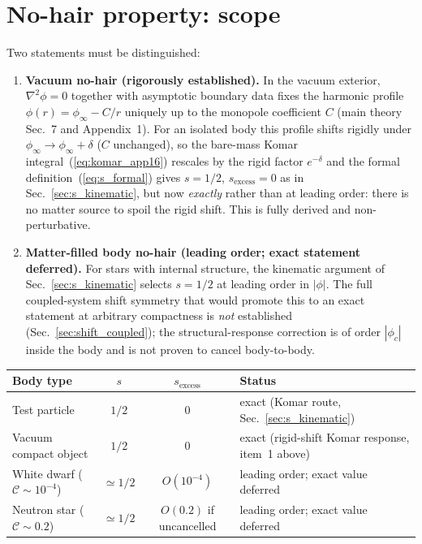 \documentclass[11pt]{article}
\newcommand{\Cc}{\mathcal{C}}
\begin{document}
\section{No-hair property: scope}
\label{sec:nohair}

Two statements must be distinguished:
\begin{enumerate}
\item \textbf{Vacuum no-hair (rigorously established).}
  In the vacuum exterior, $\nabla^2\phi = 0$ together with
  asymptotic boundary data fixes the harmonic profile
  $\phi(r) = \phi_\infty - C/r$ uniquely up to the monopole
  coefficient $C$ (main theory Sec.~7 and Appendix~1).
  For an isolated body this profile shifts rigidly under
  $\phi_\infty\to\phi_\infty+\delta$ ($C$ unchanged), so
  the bare-mass Komar
  integral~(\ref{eq:komar_app16}) rescales by the rigid
  factor $e^{-\delta}$ and the formal
  definition~(\ref{eq:s_formal}) gives $s=1/2$,
  $s_{\mathrm{excess}}=0$ as in
  Sec.~\ref{sec:s_kinematic}, but now \emph{exactly}
  rather than at leading order: there is no matter source
  to spoil the rigid shift.  This is fully derived and
  non-perturbative.
\item \textbf{Matter-filled body no-hair (leading order;
  exact statement deferred).}  For stars with internal
  structure, the kinematic argument of
  Sec.~\ref{sec:s_kinematic} selects $s=1/2$ at leading
  order in $|\phi|$.  The full coupled-system shift
  symmetry that would promote this to an exact statement
  at arbitrary compactness is \emph{not} established
  (Sec.~\ref{sec:shift_coupled}); the structural-response
  correction is of order $|\phi_c|$ inside the body and
  is not proven to cancel body-to-body.
\end{enumerate}

\begin{center}
\begin{tabular}{lccl}
\hline
Body type & $s$ & $s_{\mathrm{excess}}$ & Status \\
\hline
Test particle & $1/2$ & $0$ & exact (Komar route, Sec.~\ref{sec:s_kinematic}) \\
Vacuum compact object & $1/2$ & $0$ & exact (rigid-shift Komar response, item~1 above) \\
White dwarf ($\Cc \sim 10^{-4}$) & $\simeq 1/2$ &
  $O(10^{-4})$ & leading order; exact value deferred \\
Neutron star ($\Cc \sim 0.2$) & $\simeq 1/2$ &
  $O(0.2)$ if uncancelled & leading order; exact value deferred \\
\hline
\end{tabular}
\end{center}
\end{document}
